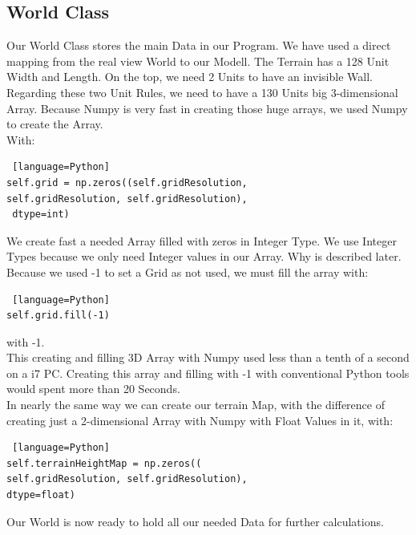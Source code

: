 \documentclass{sig-alternate-05-2015}
\begin{document}
\subsection{World Class}
Our World Class stores the main Data in our Program. We have used a direct mapping from the real view World to our Modell. The Terrain has a 128 Unit Width and Length. On the top, we need 2 Units to have an invisible Wall. Regarding these two Unit Rules, we need to have a 130 Units big 3-dimensional Array. Because Numpy is very fast in creating those huge arrays, we used Numpy to create the Array. \\
With:\\
\begin{lstlisting} [language=Python]
self.grid = np.zeros((self.gridResolution, 
self.gridResolution, self.gridResolution),
 dtype=int)
\end{lstlisting}
We create fast a needed Array filled with zeros in Integer Type. We use Integer Types because we only need Integer values in our Array. Why is described later. Because we used -1 to set a Grid as not used, we must fill the array with:\\
\begin{lstlisting} [language=Python]
self.grid.fill(-1)
\end{lstlisting}
with -1. \\
This creating and filling 3D Array with Numpy used less than a tenth of a second on a i7 PC. Creating this array and filling with -1 with conventional Python tools would spent more than 20 Seconds. \\
In nearly the same way we can create our terrain Map, with the difference of creating just a 2-dimensional Array with Numpy with Float Values in it, with: \\
\begin{lstlisting} [language=Python]
self.terrainHeightMap = np.zeros((
self.gridResolution, self.gridResolution), 
dtype=float)
\end{lstlisting}
Our World is now ready to hold all our needed Data for further calculations.\\
\end{document}
